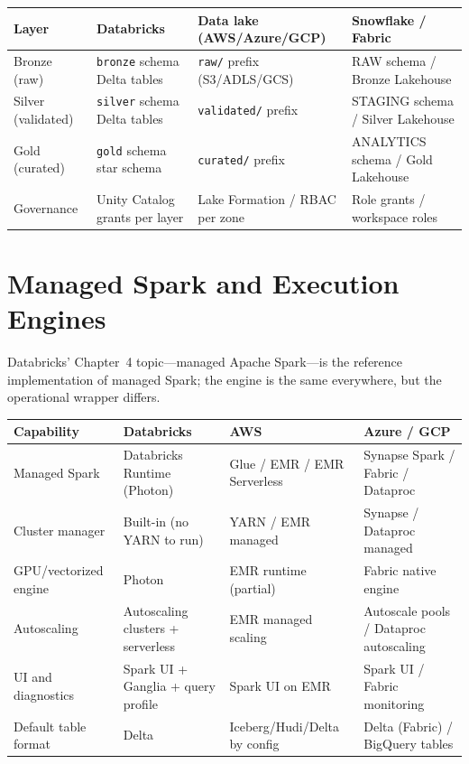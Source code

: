 \begin{center}
\footnotesize
\begin{tabular}{@{}p{2.6cm}p{3.4cm}p{3.4cm}p{3.0cm}@{}}
\toprule
\textbf{Layer} & \textbf{Databricks} & \textbf{Data lake (AWS/Azure/GCP)} & \textbf{Snowflake / Fabric} \\
\midrule
Bronze (raw) & \texttt{bronze} schema Delta tables & \texttt{raw/} prefix (S3/ADLS/GCS) & RAW schema / Bronze Lakehouse \\
Silver (validated) & \texttt{silver} schema Delta tables & \texttt{validated/} prefix & STAGING schema / Silver Lakehouse \\
Gold (curated) & \texttt{gold} schema star schema & \texttt{curated/} prefix & ANALYTICS schema / Gold Lakehouse \\
Governance & Unity Catalog grants per layer & Lake Formation / RBAC per zone & Role grants / workspace roles \\
\bottomrule
\end{tabular}
\end{center}

\section{Managed Spark and Execution Engines}
%
Databricks' Chapter~4 topic---managed Apache Spark---is the reference implementation of
managed Spark; the engine is the same everywhere, but the operational wrapper differs.

\begin{center}
\footnotesize
\begin{tabular}{@{}p{3.0cm}p{3.4cm}p{3.2cm}p{3.2cm}@{}}
\toprule
\textbf{Capability} & \textbf{Databricks} & \textbf{AWS} & \textbf{Azure / GCP} \\
\midrule
Managed Spark & Databricks Runtime (Photon) & Glue / EMR / EMR Serverless & Synapse Spark / Fabric / Dataproc \\
Cluster manager & Built-in (no YARN to run) & YARN / EMR managed & Synapse / Dataproc managed \\
GPU/vectorized engine & Photon & EMR runtime (partial) & Fabric native engine \\
Autoscaling & Autoscaling clusters + serverless & EMR managed scaling & Autoscale pools / Dataproc autoscaling \\
UI and diagnostics & Spark UI + Ganglia + query profile & Spark UI on EMR & Spark UI / Fabric monitoring \\
Default table format & Delta & Iceberg/Hudi/Delta by config & Delta (Fabric) / BigQuery tables \\
\bottomrule
\end{tabular}
\end{center}

